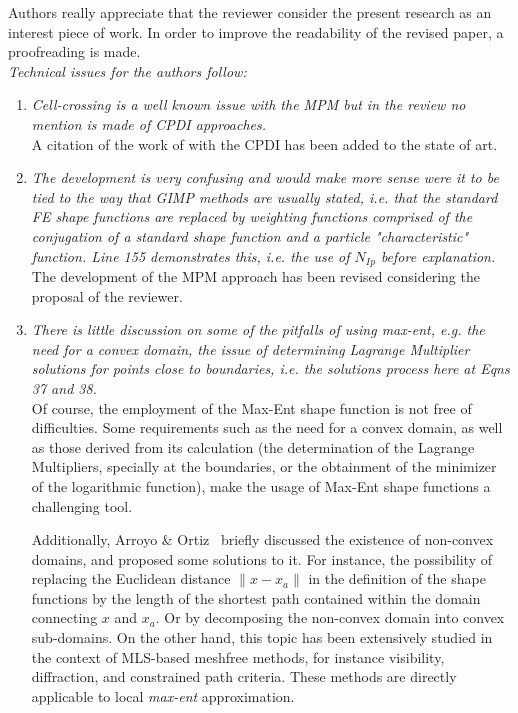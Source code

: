 \documentclass[12pt]{article}
\begin{document}
Authors really appreciate that the reviewer consider the present research as an interest piece of work. In order to improve the readability of the revised paper, a proofreading is made.\\

\textit{Technical issues for the authors follow:}
 \begin{enumerate}
\item \textit{Cell-crossing is a well known issue with the MPM but in the review no mention is made of CPDI approaches.}\\

A citation of the work of \cite{Sadeghirad_2011} with the CPDI has been added to the state of art.

\item \textit{The development is very confusing and would make more sense were it to be tied to 
the way that GIMP methods are usually stated, i.e. that the standard FE shape functions are replaced by weighting functions comprised of the conjugation of a standard shape function and a particle "characteristic" function. Line 155 demonstrates this, i.e. the use of $N_{Ip}$ before explanation.}\\

The development of the MPM approach has been revised considering the proposal of the reviewer. 

\item \textit{There is little discussion on some of the pitfalls of using max-ent, e.g. the need for a convex domain, the issue of determining Lagrange Multiplier solutions for points close to boundaries, i.e. the solutions process here at Eqns 37 and 38.}\\

Of course, the employment of the Max-Ent shape function is not free of difficulties. Some requirements such as the need for a convex domain, as well as those derived from its calculation (the determination of the Lagrange Multipliers, specially at the boundaries, or the obtainment of the minimizer of the logarithmic function), make the usage of Max-Ent shape functions a challenging tool.  

Additionally, Arroyo \& Ortiz~\cite{Arroyo2006} briefly discussed the existence of non-convex domains, and proposed some solutions to it. 
For instance, the possibility of replacing the Euclidean distance $\lVert  x - x_a  \rVert$ in the definition of the shape functions by the length of the shortest path contained within the domain connecting $x$ and $x_a$. Or by decomposing the non-convex domain into convex sub-domains.  On the other hand, this topic has been extensively studied in the context of MLS-based meshfree methods, for instance visibility, diffraction, and constrained path criteria.  These methods are directly applicable to local \textit{max-ent} approximation. 


\end{enumerate}
\end{document}
